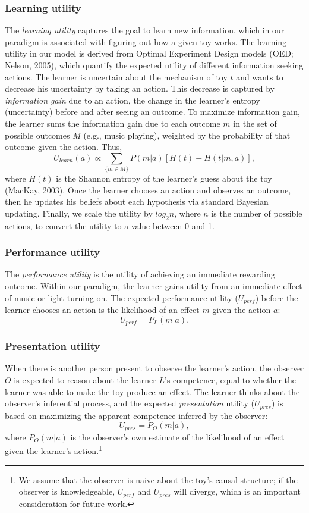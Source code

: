 \documentclass[10pt, letterpaper]{article}
\begin{document}
\subsubsection{Learning utility}\label{learning-utility}

The \emph{learning utility} captures the goal to learn new information,
which in our paradigm is associated with figuring out how a given toy
works. The learning utility in our model is derived from Optimal
Experiment Design models (OED; Nelson, 2005), which quantify the
expected utility of different information seeking actions. The learner
is uncertain about the mechanism of toy \(t\) and wants to decrease his
uncertainty by taking an action. This decrease is captured by
\emph{information gain} due to an action, the change in the learner's
entropy (uncertainty) before and after seeing an outcome. To maximize
information gain, the learner sums the information gain due to each
outcome \(m\) in the set of possible outcomes \(M\) (e.g., music
playing), weighted by the probability of that outcome given the action.
Thus,
\[ U_{learn}(a) \propto \sum_{\{m \in M\}}{P(m|a)}[{H(t) - H(t | m,a)}],\]
\noindent
where \(H(t)\) is the Shannon entropy of the learner's guess about the
toy (MacKay, 2003). Once the learner chooses an action and observes an
outcome, then he updates his beliefs about each hypothesis via standard
Bayesian updating. Finally, we scale the utility by \(log_2n\), where
\(n\) is the number of possible actions, to convert the utility to a
value between 0 and 1.

\subsubsection{Performance utility}\label{performance-utility}

The \emph{performance utility} is the utility of achieving an immediate
rewarding outcome. Within our paradigm, the learner gains utility from
an immediate effect of music or light turning on. The expected
performance utility (\(U_{perf}\)) before the learner chooses an action
is the likelihood of an effect \(m\) given the action \(a\):
\[ U_{perf} = P_L(m | a).\] \noindent

\subsubsection{Presentation utility}\label{presentation-utility}

When there is another person present to observe the learner's action,
the observer \(O\) is expected to reason about the learner \(L\)'s
competence, equal to whether the learner was able to make the toy
produce an effect. The learner thinks about the observer's inferential
process, and the expected \emph{presentation} utility (\(U_{pres}\)) is
based on maximizing the apparent competence inferred by the observer:
\[ U_{pres} = P_O(m | a),\] \noindent
where \(P_O(m | a)\) is the observer's own estimate of the likelihood of
an effect given the learner's action.\footnote{We assume that the
  observer is naive about the toy's causal structure; if the observer is
  knowledgeable, \(U_{perf}\) and \(U_{pres}\) will diverge, which is an
  important consideration for future work.}
\end{document}
